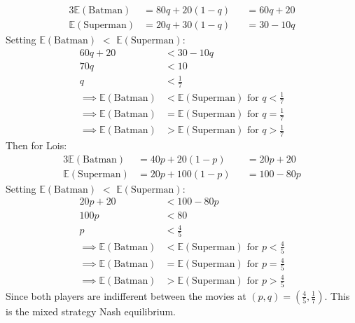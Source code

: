 \documentclass{article}
\newcommand{\tE}[1]{$\mathbb{E}(\mbox{#1})$}
\newcommand{\E}[1]{\mathbb{E}(\mbox{#1})}
\begin{document}
\begin{alignat}{3}
    \E{Batman} &= 80q + 20(1-q) &&= 60q + 20\\
    \E{Superman} &= 20q + 30(1-q) &&= 30 - 10q
\end{alignat}
Setting \tE{Batman} $<$ \tE{Superman}:
\begin{align*}
    60q + 20 &< 30 - 10q\\
    70q &< 10\\
    q &< \frac{1}{7}\\
    \implies \E{Batman} &< \E{Superman} \mbox{ for } q < \frac{1}{7}\\
    \implies \E{Batman} &= \E{Superman} \mbox{ for } q = \frac{1}{7}\\
    \implies \E{Batman} &> \E{Superman} \mbox{ for } q > \frac{1}{7}
\end{align*}
Then for Lois:
\begin{alignat}{3}
    \E{Batman} &= 40p + 20(1-p) &&= 20p + 20\\
    \E{Superman} &= 20p + 100(1-p) &&= 100 - 80p
\end{alignat}
Setting \tE{Batman} $<$ \tE{Superman}:
\begin{align*}
    20p + 20 &< 100 - 80p\\
    100p &< 80\\
    p &< \frac{4}{5}\\
    \implies \E{Batman} &< \E{Superman} \mbox{ for } p < \frac{4}{5}\\
    \implies \E{Batman} &= \E{Superman} \mbox{ for } p = \frac{4}{5}\\
    \implies \E{Batman} &> \E{Superman} \mbox{ for } p > \frac{4}{5}
\end{align*}
Since both players are indifferent between the movies at $(p, q) = (\frac{4}{5}, \frac{1}{7})$. This is the mixed strategy Nash equilibrium.
\end{document}
